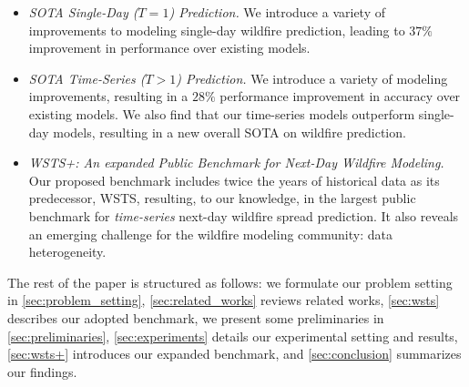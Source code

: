 \begin{itemize}
    \item \textit{SOTA Single-Day ($T=1$) Prediction.} We introduce a variety of improvements to modeling single-day wildfire prediction, leading to $37\%$ improvement in performance over existing models. 
    \item \textit{SOTA Time-Series ($T>1$) Prediction.}  We introduce a variety of modeling improvements, resulting in a $28 \%$ performance improvement in accuracy over existing models. We also find that our time-series models outperform single-day models, resulting in a new overall SOTA on wildfire prediction. 
    \item \textit{WSTS+: An expanded Public Benchmark for Next-Day Wildfire Modeling.} Our proposed benchmark includes twice the years of historical data as its predecessor, WSTS, resulting, to our knowledge, in the largest public benchmark for \textit{time-series} next-day wildfire spread prediction.  It also reveals an emerging challenge for the wildfire modeling community: data heterogeneity.   
\end{itemize}


The rest of the paper is structured as follows: we formulate our problem setting in \cref{sec:problem_setting}, \cref{sec:related_works} reviews related works,  \cref{sec:wsts} describes our adopted benchmark, we present some preliminaries in \cref{sec:preliminaries}, \cref{sec:experiments} details our experimental setting and results, \cref{sec:wsts+} introduces our expanded benchmark, and \cref{sec:conclusion} summarizes our findings.